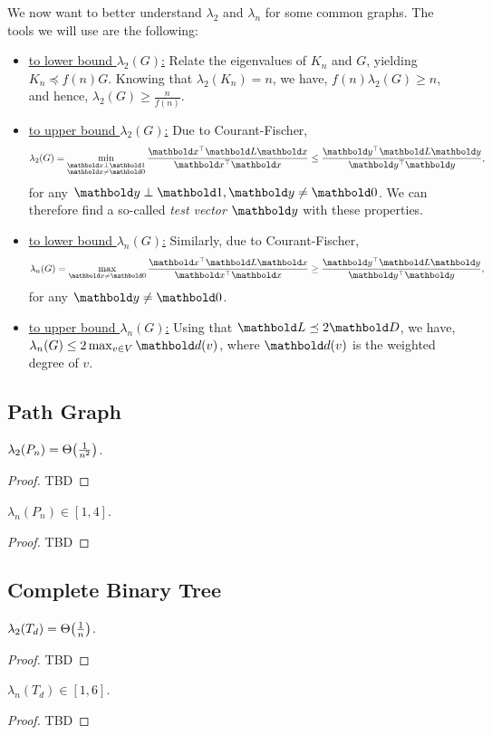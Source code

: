 We now want to better understand $\lambda_2$ and $\lambda_n$ for some common graphs. The tools we will use are the following: \begin{itemize}
    \item \underline{to lower bound $\lambda_2(G)$:} Relate the eigenvalues of $K_n$ and $G$, yielding $K_n \preceq f(n) G$. Knowing that $\lambda_2(K_n) = n$, we have, $f(n) \lambda_2(G) \geq n$, and hence, $\lambda_2(G) \geq \frac{n}{f(n)}$.
    \item \underline{to upper bound $\lambda_2(G)$:} Due to Courant-Fischer, \begin{align*}
        \lambda_2(G) = \min_{\substack{\vx \perp \vOne \\ \vx \neq \vZero}} \frac{\trans{\vx}\mL\vx}{\trans{\vx}\vx} \leq \frac{\trans{\vy}\mL\vy}{\trans{\vy}\vy},
    \end{align*} for any $\vy \perp \vOne, \vy \neq \vZero$. We can therefore find a so-called \emph{test vector} $\vy$ with these properties.
    \item \underline{to lower bound $\lambda_n(G)$:} Similarly, due to Courant-Fischer, \begin{align*}
        \lambda_n(G) = \max_{\vx \neq \vZero} \frac{\trans{\vx}\mL\vx}{\trans{\vx}\vx} \geq \frac{\trans{\vy}\mL\vy}{\trans{\vy}\vy},
    \end{align*} for any $\vy \neq \vZero$.
    \item \underline{to upper bound $\lambda_n(G)$:} Using that $\mL \preceq 2 \mD$, we have, $\lambda_n(G) \leq 2 \max_{v \in \sV} \vd(v)$, where $\vd(v)$ is the weighted degree of $v$.
\end{itemize}

\subsection{Path Graph}

\begin{lem} $\lambda_2(P_n) = \Theta\parentheses*{\frac{1}{n^2}}$.
\end{lem}
\begin{proof}
TBD
\end{proof}

\begin{lem} $\lambda_n(P_n) \in [1,4]$.
\end{lem}
\begin{proof}
TBD
\end{proof}

\subsection{Complete Binary Tree}

\begin{lem} $\lambda_2(T_d) = \Theta\parentheses*{\frac{1}{n}}$.
\end{lem}
\begin{proof}
TBD
\end{proof}

\begin{lem} $\lambda_n(T_d) \in [1,6]$.
\end{lem}
\begin{proof}
TBD
\end{proof}